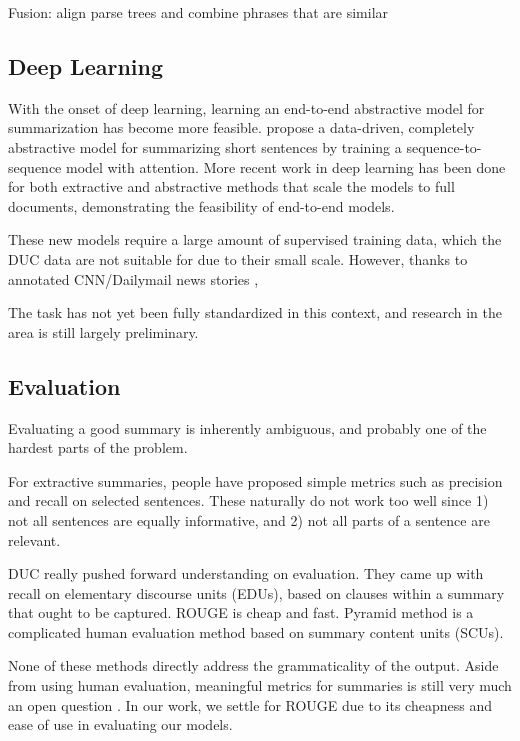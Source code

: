 \documentclass[11pt]{report}
\begin{document}
Fusion: align parse trees and combine phrases that are similar %


\subsection{Deep Learning}

With the onset of deep learning, learning an end-to-end abstractive model for summarization has become more feasible. \citet{rush2015neural} propose a data-driven, completely abstractive model for summarizing short sentences by training a sequence-to-sequence model with attention. More recent work in deep learning has been done for both extractive \citep{} %
and abstractive \citep{nallapati2016seq2seq, ramachandran2016} methods that scale the models to full documents, demonstrating the feasibility of end-to-end models.

These new models require a large amount of supervised training data, which the DUC data are not suitable for due to their small scale. However, thanks to annotated CNN/Dailymail news stories \cite{hermann2015read}, %

The task has not yet been fully standardized in this context, and research in the area is still largely preliminary.



\subsection{Evaluation}

Evaluating a good summary is inherently ambiguous, and probably one of the hardest parts of the problem.

For extractive summaries, people have proposed simple metrics such as precision and recall on selected sentences. These naturally do not work too well since 1) not all sentences are equally informative, and 2) not all parts of a sentence are relevant.

DUC really pushed forward understanding on evaluation. They came up with recall on elementary discourse units (EDUs), based on clauses within a summary that ought to be captured. ROUGE \cite{lin2004rouge} is cheap and fast. Pyramid method is a complicated human evaluation method based on summary content units (SCUs). 

None of these methods directly address the grammaticality of the output. Aside from using human evaluation, meaningful metrics for summaries is still very much an open question \citep{toutanova2016summarymetrics}. In our work, we settle for ROUGE due to its cheapness and ease of use in evaluating our models.
\end{document}
